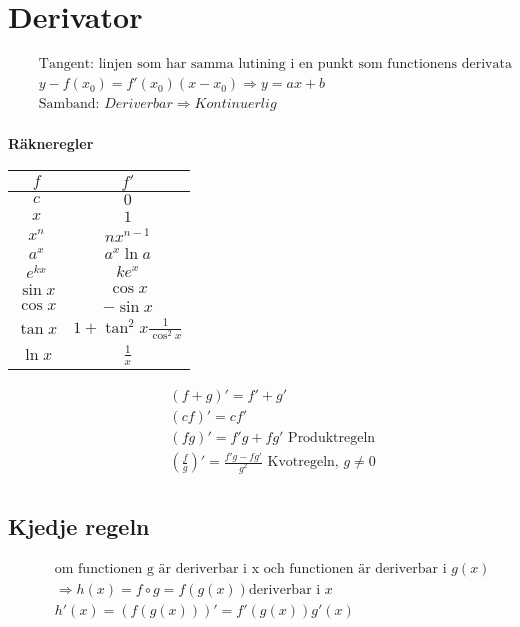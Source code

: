\section{Derivator}
\begin{align*}
  &\quad  \text{Tangent: linjen som har samma lutining i en punkt som functionens derivata} \\
  &\quad  y-f(x_0)=f'(x_0)(x-x_0) \Rightarrow y=ax+b \\ %
  &\quad  \text{Samband: } Deriverbar \Rightarrow Kontinuerlig \\
\end{align*}

\textbf{Räkneregler}
\begin{center}
\begin{tabular}{ |c|c| } 
 \hline
 $f$       & $f'$         \\
 \hline
 $c$       & $0$          \\
 $x$       & $1$          \\ 
 $x^n$     & $nx^{n-1}$    \\  
 $a^x$     & $a^x\ln{a}$   \\ 
 $e^{kx}$  & $ke^{x}$       \\
 $\sin{x}$ & $\cos{x}$     \\
 $\cos{x}$ & $-\sin{x}$    \\
 $\tan{x}$ & $1+\tan^2{x}\frac{1}{\cos^2{x}}$    \\
 $\ln{x}$  & $\frac{1}{x}$ \\
 \hline
\end{tabular}
\end{center}

\begin{align*}
  &\quad  (f+g)' = f' + g' \\
  &\quad  (cf)'  = cf' \\
  &\quad  (fg)'  = f'g + fg' \text{ Produktregeln} \\
  &\quad  (\frac{f}{g})' = \frac{f'g - fg'}{g^2} \text{ Kvotregeln, } g \neq 0 \\
\end{align*}


\subsection{Kjedje regeln}
\begin{align*}
  &\quad  \text{om functionen g är deriverbar i x och functionen är deriverbar i } g(x) \\
  &\quad  \Rightarrow h(x)=f \circ g = f(g(x)) \text{deriverbar i } x \\
  &\quad  h'(x)=(f(g(x)))'=f'(g(x))g'(x) \\ 
\end{align*}

